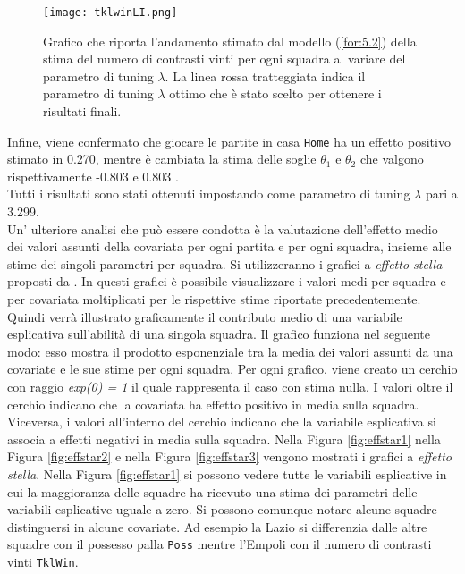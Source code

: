 \begin{figure}[htbp]
	\begin{center}
		\texttt{[image: tklwinLI.png]}
		\caption{Grafico che riporta l'andamento stimato dal modello (\ref{for:5.2}) della stima del numero di contrasti vinti per ogni squadra al variare del parametro di tuning $\lambda$. La linea rossa tratteggiata indica il parametro di tuning $\lambda$ ottimo che è stato scelto per ottenere i risultati finali.} \label{fig:tklwinLI}
	\end{center}
\end{figure}
Infine, viene confermato che giocare le partite in casa \texttt{Home} ha un effetto positivo stimato in 0.270, mentre è cambiata la stima delle soglie $\theta_1$ e $\theta_2$ che valgono rispettivamente -0.803  e 0.803 .\\
Tutti i risultati sono stati ottenuti impostando come parametro di tuning $\lambda$ pari a 3.299.\\

Un' ulteriore analisi che può essere condotta è la valutazione dell'effetto medio dei valori assunti della covariata per ogni partita e per ogni squadra, insieme alle stime dei singoli parametri per squadra. Si utilizzeranno i grafici a \emph{effetto stella} proposti da \textcite{tutz2013visualization}. In questi grafici è possibile visualizzare i valori medi per squadra e per covariata moltiplicati per le rispettive stime riportate precedentemente. Quindi verrà illustrato graficamente il contributo medio di una variabile esplicativa sull'abilità di una singola squadra. Il grafico funziona nel seguente modo: esso mostra il prodotto esponenziale tra la media dei valori assunti da una covariate e le sue stime per ogni squadra. Per ogni grafico, viene creato un cerchio con raggio \emph{exp(0) = 1} il quale rappresenta il caso con stima nulla. I valori oltre il cerchio indicano che la covariata ha effetto positivo in media sulla squadra. Viceversa, i valori all'interno del cerchio indicano che la variabile esplicativa si associa a effetti negativi in media sulla squadra. Nella Figura \ref{fig:effstar1} nella Figura \ref{fig:effstar2} e nella Figura \ref{fig:effstar3} vengono mostrati i grafici a \emph{effetto stella}.
Nella Figura \ref{fig:effstar1} si possono vedere tutte le variabili esplicative in cui la maggioranza delle squadre ha ricevuto una stima dei parametri delle variabili esplicative   uguale a zero. Si possono comunque notare alcune squadre distinguersi in alcune covariate.
Ad esempio la Lazio si differenzia dalle altre squadre con il possesso palla \texttt{Poss} mentre l'Empoli con il numero di contrasti vinti \texttt{TklWin}.\\

